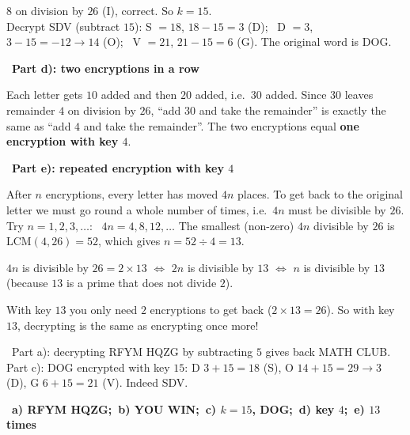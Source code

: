 \documentclass[11pt]{article}
\providecommand{\AnsWord}{Đáp số}
\newcommand{\ans}[1]{\par\smallskip{\bfseries\color{tmGreen!88!black}\AnsWord:}\ {\bfseries\color{AnsRed}#1}\par}
\newcommand{\step}[2]{\par\smallskip\noindent{\bfseries\color{tmBlue!85!black}\StepWord~#1.}\ {\bfseries #2}\par\nopagebreak}
\newcommand{\verify}[1]{\par\smallskip\noindent{\bfseries\color{tmGreen!80!black}\faCheckCircle\ \CheckWord}\ #1\par}
\def\AnsWord{Answer}
\def\StepWord{Step}
\def\CheckWord{Check:}
\begin{document}
{$8$ on division by $26$ (I), correct. So $k = 15$.\\
Decrypt \textsf{SDV} (subtract $15$): S $= 18$, $18 - 15 = 3$ (D); \ D $= 3$, $3 - 15 = -12 \to 14$ (O); \ V $= 21$, $21 - 15 = 6$ (G).
The original word is \textsf{DOG}.
\step{4}{Part d): two encryptions in a row}
Each letter gets $10$ added and then $20$ added, i.e.\ $30$ added. Since $30$ leaves remainder $4$ on division by $26$, ``add $30$ and
take the remainder'' is exactly the same as ``add $4$ and take the remainder''. The two encryptions equal \textbf{one encryption with
key $4$}.
\step{5}{Part e): repeated encryption with key $4$}
After $n$ encryptions, every letter has moved $4n$ places. To get back to the original letter we must go round a whole number of
times, i.e.\ $4n$ must be divisible by $26$. Try $n = 1, 2, 3, \dots$: \ $4n = 4, 8, 12, \dots$ The smallest (non-zero) $4n$
divisible by $26$ is $\text{LCM}(4, 26) = 52$, which gives $n = 52 \div 4 = 13$.
\begin{recallbox}$4n$ is divisible by $26 = 2\times 13$ $\Leftrightarrow$ $2n$ is divisible by $13$ $\Leftrightarrow$ $n$ is divisible
by $13$ (because $13$ is a prime that does not divide $2$).\end{recallbox}
\begin{tipbox}With key $13$ you only need $2$ encryptions to get back ($2\times 13 = 26$). So with key $13$,
decrypting is the same as encrypting once more!\end{tipbox}
\verify{Part a): decrypting \textsf{RFYM HQZG} by subtracting $5$ gives back \textsf{MATH CLUB}. Part c): \textsf{DOG} encrypted with key
$15$: D $3 + 15 = 18$ (S), O $14 + 15 = 29 \to 3$ (D), G $6 + 15 = 21$ (V). Indeed \textsf{SDV}.}
\ans{a) \textsf{RFYM HQZG};\ b) \textsf{YOU WIN};\ c) $k = 15$, \textsf{DOG};\ d) key $4$;\ e) $13$ times}
}
\end{document}
